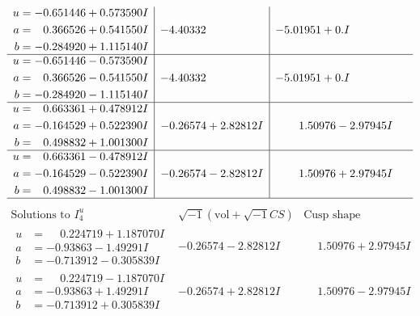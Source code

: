 \documentclass[1p]{elsarticle_modified}
\theoremstyle{definition}
\newcommand{\I}{\sqrt{-1}}
\begin{document}
$$\begin{array}{c|c|c}
\begin{aligned}
u &= -0.651446 + 0.573590 I \\
a &= \phantom{-}0.366526 + 0.541550 I \\
b &= -0.284920 + 1.115140 I\end{aligned}
 & -4.40332\phantom{ +0.000000I} & -5.01951 + 0. I\phantom{ +0.000000I} \\ \hline\begin{aligned}
u &= -0.651446 - 0.573590 I \\
a &= \phantom{-}0.366526 - 0.541550 I \\
b &= -0.284920 - 1.115140 I\end{aligned}
 & -4.40332\phantom{ +0.000000I} & -5.01951 + 0. I\phantom{ +0.000000I} \\ \hline\begin{aligned}
u &= \phantom{-}0.663361 + 0.478912 I \\
a &= -0.164529 + 0.522390 I \\
b &= \phantom{-}0.498832 + 1.001300 I\end{aligned}
 & -0.26574 + 2.82812 I & \phantom{-}1.50976 - 2.97945 I \\ \hline\begin{aligned}
u &= \phantom{-}0.663361 - 0.478912 I \\
a &= -0.164529 - 0.522390 I \\
b &= \phantom{-}0.498832 - 1.001300 I\end{aligned}
 & -0.26574 - 2.82812 I & \phantom{-}1.50976 + 2.97945 I\\
 \hline 
 \end{array}$$\newpage$$\begin{array}{c|c|c}  
\text{Solutions to }I^u_{4}& \I (\text{vol} + \sqrt{-1}CS) & \text{Cusp shape}\\
 \hline 
\begin{aligned}
u &= \phantom{-}0.224719 + 1.187070 I \\
a &= -0.93863 - 1.49291 I \\
b &= -0.713912 - 0.305839 I\end{aligned}
 & -0.26574 - 2.82812 I & \phantom{-}1.50976 + 2.97945 I \\ \hline\begin{aligned}
u &= \phantom{-}0.224719 - 1.187070 I \\
a &= -0.93863 + 1.49291 I \\
b &= -0.713912 + 0.305839 I\end{aligned}
 & -0.26574 + 2.82812 I & \phantom{-}1.50976 - 2.97945 I \\ \hline\begin{aligned}

\end{aligned}
\end{array}$$
\end{document}
